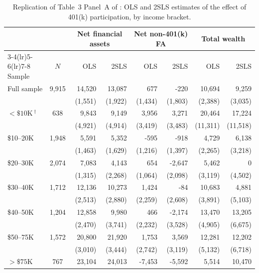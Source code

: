 \documentclass[11pt]{article}
\begin{document}
\begin{table}[H]
  \centering
  \caption{Replication of Table~3 Panel~A of \cite{ch2004}: OLS and 2SLS
  estimates of the effect of 401(k) participation, by income bracket.}
  \label{tab:rep}
  \footnotesize
  \begin{tabular}{l c r r r r r r}
    \toprule
    & & \multicolumn{2}{c}{Net financial assets} & \multicolumn{2}{c}{Net non-401(k) FA} & \multicolumn{2}{c}{Total wealth} \\
    \cmidrule(lr){3-4}\cmidrule(lr){5-6}\cmidrule(lr){7-8}
    Sample & $N$ & {OLS} & {2SLS} & {OLS} & {2SLS} & {OLS} & {2SLS} \\
    \midrule
    Full sample
      & 9{,}915 & 14{,}520 & 13{,}087 &      677 &     -220 & 10{,}694 &  9{,}259 \\
      &         & (1{,}551)& (1{,}922)& (1{,}434)& (1{,}803)& (2{,}388)& (3{,}035)\\[2pt]
    $<\!\$10$K\,$^\dagger$
      &    638 &  9{,}843 &  9{,}149 &  3{,}956 &  3{,}271 & 20{,}464 & 17{,}224 \\
      &        & (4{,}921)& (4{,}914)& (3{,}419)& (3{,}483)&(11{,}311)&(11{,}518)\\[2pt]
    \$10--20K
      & 1{,}948 &  5{,}591 &  5{,}352 &     -595 &     -918 &  4{,}729 &  6{,}138 \\
      &         & (1{,}463)& (1{,}629)& (1{,}216)& (1{,}397)& (2{,}265)& (3{,}218)\\[2pt]
    \$20--30K
      & 2{,}074 &  7{,}083 &  4{,}143 &      654 & -2{,}647 &  5{,}462 &        0 \\
      &         & (1{,}315)& (2{,}268)& (1{,}064)& (2{,}098)& (3{,}119)& (4{,}502)\\[2pt]
    \$30--40K
      & 1{,}712 & 12{,}136 & 10{,}273 &  1{,}424 &      -84 & 10{,}683 &  4{,}881 \\
      &         & (2{,}513)& (2{,}880)& (2{,}259)& (2{,}608)& (3{,}891)& (5{,}103)\\[2pt]
    \$40--50K
      & 1{,}204 & 12{,}858 &  9{,}980 &      466 & -2{,}174 & 13{,}470 & 13{,}205 \\
      &         & (2{,}470)& (3{,}741)& (2{,}232)& (3{,}528)& (4{,}905)& (6{,}675)\\[2pt]
    \$50--75K
      & 1{,}572 & 20{,}800 & 21{,}920 &  1{,}753 &  3{,}569 & 12{,}281 & 12{,}202 \\
      &         & (3{,}010)& (3{,}444)& (2{,}742)& (3{,}119)& (5{,}132)& (6{,}718)\\[2pt]
    $>\!\$75$K
      &    767 & 23{,}104 & 24{,}013 & -7{,}453 & -5{,}592 &  5{,}514 & 10{,}470 \\

\end{tabular}
\end{table}
\end{document}
